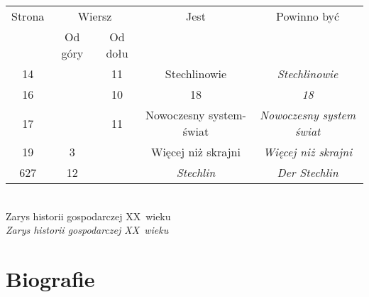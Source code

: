 \documentclass[a4paper,11pt]{article}
\numberwithin{equation}{section}
\begin{document}

\vspace{0em}


\begin{center}

  \begin{tabular}{|c|c|c|c|c|}
    \hline
    Strona & \multicolumn{2}{c|}{Wiersz} & Jest
                              & Powinno być \\ \cline{2-3}
    & Od góry & Od dołu & & \\
    \hline
    14  & & 11 & Stechlinowie & \textit{Stechlinowie} \\
    16  & & 10 & 18 & \textit{18} \\
    17  & & 11 & Nowoczesny system-świat
           & \textit{Nowoczesny system świat} \\
    19  &  3 & & Więcej niż skrajni & \textit{Więcej niż skrajni} \\
    627 & 12 & & \textit{Stechlin} & \textit{Der Stechlin} \\
    \hline
  \end{tabular}

\end{center}

\VerSpaceTwo


\noindent
{} \\
\Jest Zarys historii gospodarczej XX~wieku \\
\PowinnoByc \textit{Zarys historii gospodarczej XX~wieku}












\newpage

\section{Biografie}


\VerSpaceTwo
\end{document}
